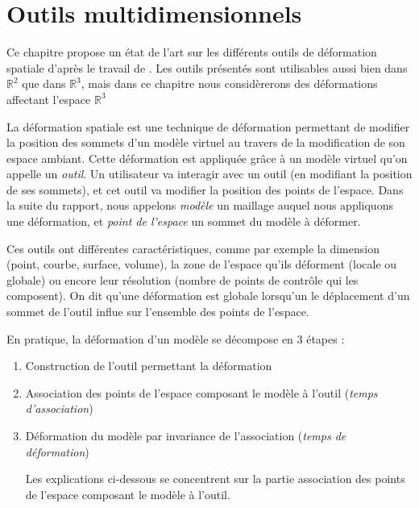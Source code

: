 

\chapter{Outils multidimensionnels}

\graphicspath{{Chapter1/Chapter1Figs/PNG/}{Chapter1/Chapter1Figs/PDF/}{Chapter1/Chapter1Figs/}}

Ce chapitre propose un état de l'art sur les différents outils de déformation
spatiale d'après le travail de \cite{GB08}. Les outils présentés sont
utilisables aussi bien dans $\mathbb{R}^2$ que dans $\mathbb{R}^3$, mais dans
ce chapitre nous considèrerons des déformations affectant l'espace
$\mathbb{R}^3$

La déformation spatiale est une technique de déformation permettant de
modifier la position des sommets d'un modèle virtuel au travers de la
modification de son espace ambiant. Cette déformation est appliquée grâce à un
modèle virtuel qu'on appelle un \textit{outil}. Un utilisateur va interagir
avec un outil (en modifiant la position de ses sommets), et cet outil va
modifier la position des points de l'espace. Dans la suite du rapport, nous
appelons \textit{modèle} un maillage auquel nous appliquons une déformation,
et \textit{point de l'espace} un sommet du modèle à déformer.

Ces outils ont différentes caractéristiques, comme par exemple la
dimension (point, courbe, surface, volume), la zone de l'espace qu'ils
déforment (locale ou globale) ou encore leur résolution (nombre
de points de contrôle qui les composent). On dit qu'une déformation est
globale lorsqu'un le déplacement d'un sommet de l'outil influe sur l'ensemble
des points de l'espace.

En pratique, la déformation d'un modèle se décompose en 3 étapes :
\begin{enumerate}

\item Construction de l'outil permettant la déformation

\item Association des points de l'espace composant le modèle à l'outil
(\textit{temps d'association})

\item Déformation du modèle par invariance de l'association (\textit{temps de
déformation})

Les explications ci-dessous se concentrent sur la partie association des
points de l'espace composant le modèle à l'outil.

\end{enumerate} 

